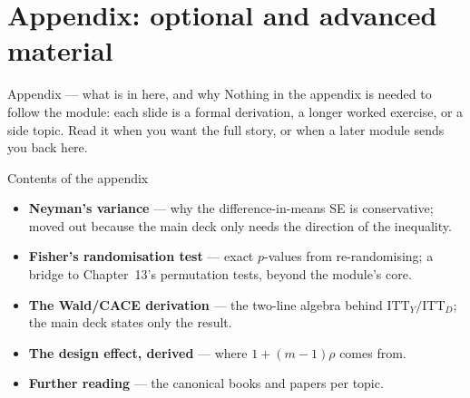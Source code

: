 \documentclass[aspectratio=169,11pt]{beamer}
\begin{document}
\appendix
\AtBeginSection[]{}
\section{Appendix: optional and advanced material}

\begin{frame}{Appendix --- what is in here, and why}
  \small
  Nothing in the appendix is needed to follow the module: each slide is a formal
  derivation, a longer worked exercise, or a side topic. Read it when you want the full
  story, or when a later module sends you back here.
  \begin{block}{Contents of the appendix}
    \begin{itemize}
      \item \textbf{Neyman's variance} --- why the difference-in-means SE is
            conservative; moved out because the main deck only needs the direction of
            the inequality.
      \item \textbf{Fisher's randomisation test} --- exact $p$-values from re-randomising;
            a bridge to Chapter~13's permutation tests, beyond the module's core.
      \item \textbf{The Wald/CACE derivation} --- the two-line algebra behind
            $\mathrm{ITT}_Y/\mathrm{ITT}_D$; the main deck states only the result.
      \item \textbf{The design effect, derived} --- where $1+(m-1)\rho$ comes from.
      \item \textbf{Further reading} --- the canonical books and papers per topic.
    \end{itemize}
  \end{block}
\end{frame}
\end{document}
